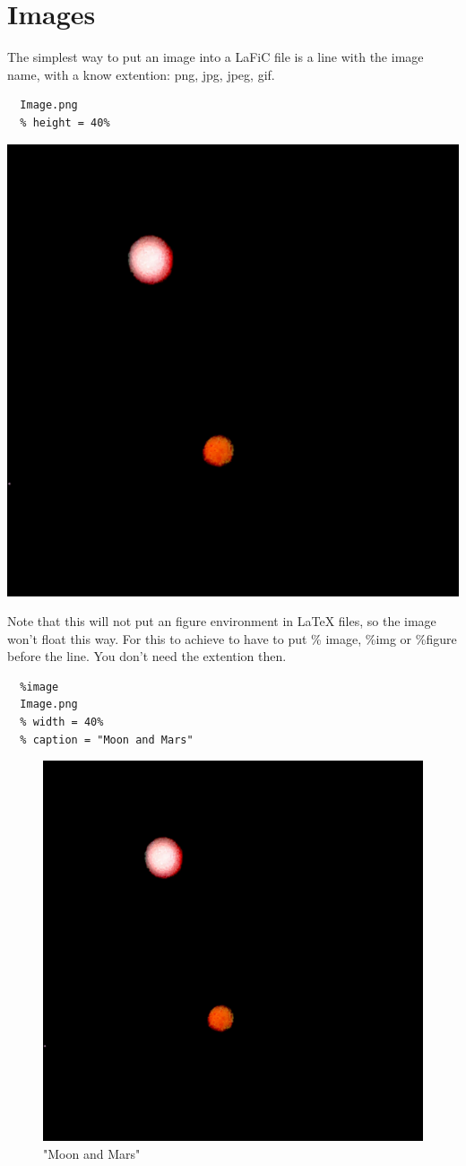 \documentclass{article}
\begin{document}
\section{Images}

The simplest way to put an image into a LaFiC file is a
line with the image name, with a know extention: png, jpg,
jpeg, gif.

\begin{verbatim}
  Image.png
  % height = 40%

\end{verbatim}

\includegraphics[height=.40\textheight]{Image.png}

Note that this will not put an figure environment in \LaTeX
files, so the image won't float this way. For this to
achieve to have to put \% image, \%img or \%figure before the
line. You don't need the extention then.

\begin{verbatim}
  %image
  Image.png
  % width = 40%
  % caption = "Moon and Mars"

\end{verbatim}

\begin{figure}[hbt]
\includegraphics[width=.40\linewidth]{Image.png}
\caption{"Moon and Mars"}
\end{figure}
\end{document}
